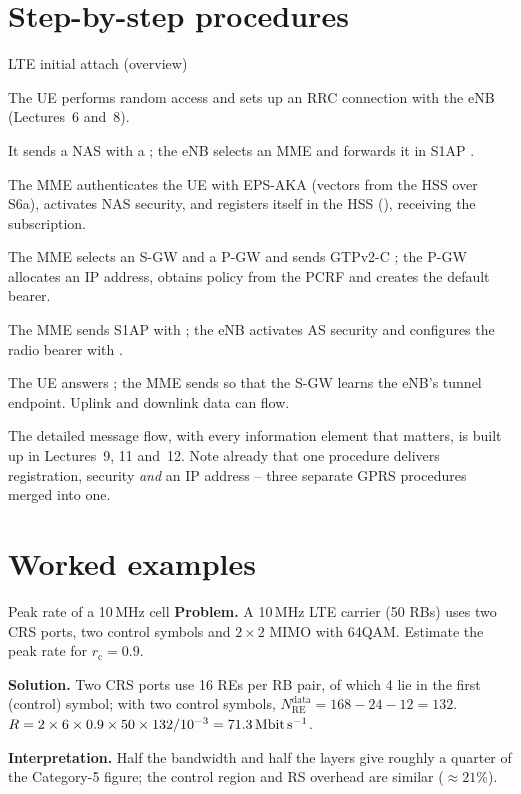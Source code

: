\documentclass[11pt,a4paper]{article}
\begin{document}
\section{Step-by-step procedures}
\begin{procedurebox}{LTE initial attach (overview)}\label{proc:attach}
\begin{steps}
  \item The UE performs random access and sets up an RRC connection with the eNB (Lectures~6 and~8).
  \item It sends a NAS  with a ; the eNB selects an
        MME and forwards it in S1AP .
  \item The MME authenticates the UE with EPS-AKA (vectors from the HSS over S6a), activates NAS
        security, and registers itself in the HSS (), receiving the subscription.
  \item The MME selects an S-GW and a P-GW and sends GTPv2-C ; the P-GW
        allocates an IP address, obtains policy from the PCRF and creates the default bearer.
  \item The MME sends S1AP  with ; the eNB
        activates AS security and configures the radio bearer with .
  \item The UE answers ; the MME sends  so that the
        S-GW learns the eNB's tunnel endpoint. Uplink and downlink data can flow.
\end{steps}
\end{procedurebox}
The detailed message flow, with every information element that matters, is built up in
Lectures~9, 11 and~12. Note already that one procedure delivers registration, security
\emph{and} an IP address -- three separate GPRS procedures merged into one.

\section{Worked examples}

\begin{examplebox}{Peak rate of a 10\,MHz cell}\label{ex:peak10}
\textbf{Problem.} A 10\,MHz LTE carrier (50 RBs) uses two CRS ports, two control symbols and
$2\times2$ MIMO with 64QAM. Estimate the peak rate for $r_\mathrm{c} = 0.9$.

\textbf{Solution.} Two CRS ports use 16 REs per RB pair, of which 4 lie in the first (control)
symbol; with two control symbols, $N_{\mathrm{RE}}^{\mathrm{data}} = 168 - 24 - 12 = 132$.
$R = 2\times6\times0.9\times50\times132/10^{-3} = \qty{71.3}{\mega\bit\per\second}$.

\textbf{Interpretation.} Half the bandwidth and half the layers give roughly a quarter of the
Category-5 figure; the control region and RS overhead are similar ($\approx21\%$).
\end{examplebox}
\end{document}

